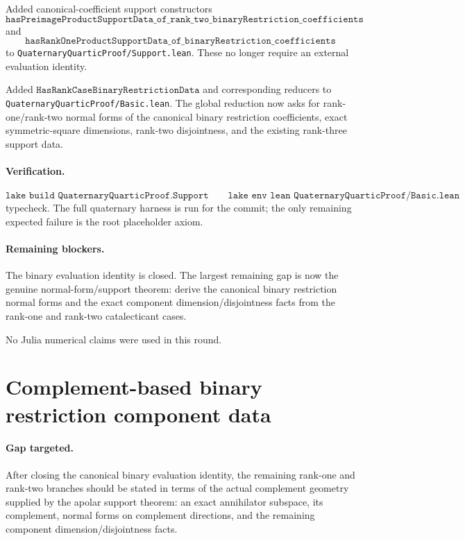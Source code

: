 \documentclass[11pt]{article}
\begin{document}
Added canonical-coefficient support constructors
\[
\texttt{hasPreimageProductSupportData\_of\_rank\_two\_binaryRestriction\_coefficients}
\]
and
\[
\texttt{hasRankOneProductSupportData\_of\_binaryRestriction\_coefficients}
\]
to \texttt{QuaternaryQuarticProof/Support.lean}.  These no longer require an
external evaluation identity.

Added \(\texttt{HasRankCaseBinaryRestrictionData}\) and corresponding reducers
to \texttt{QuaternaryQuarticProof/Basic.lean}.  The global reduction now asks
for rank-one/rank-two normal forms of the canonical binary restriction
coefficients, exact symmetric-square dimensions, rank-two disjointness, and
the existing rank-three support data.

\paragraph{Verification.}
\[
\texttt{lake build QuaternaryQuarticProof.Support}
\qquad
\texttt{lake env lean QuaternaryQuarticProof/Basic.lean}
\]
typecheck.  The full quaternary harness is run for the commit; the only
remaining expected failure is the root placeholder axiom.

\paragraph{Remaining blockers.}
The binary evaluation identity is closed.  The largest remaining gap is now
the genuine normal-form/support theorem: derive the canonical binary
restriction normal forms and the exact component dimension/disjointness facts
from the rank-one and rank-two catalecticant cases.

No Julia numerical claims were used in this round.

\section*{Complement-based binary restriction component data}

\paragraph{Gap targeted.}
After closing the canonical binary evaluation identity, the remaining rank-one
and rank-two branches should be stated in terms of the actual complement
geometry supplied by the apolar support theorem: an exact annihilator subspace,
its complement, normal forms on complement directions, and the remaining
component dimension/disjointness facts.
\end{document}

